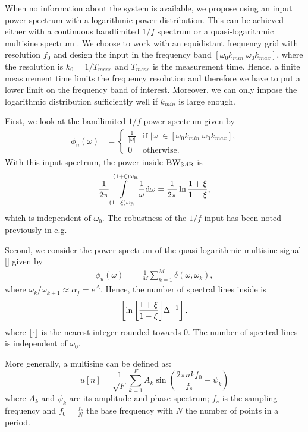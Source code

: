 When no information about the system is available, we propose using an input power spectrum with a logarithmic power distribution. This can be achieved either with a continuous bandlimited $1/f$ spectrum or a quasi-logarithmic multisine spectrum \citep{Pintelon2001}. We choose to work with an equidistant frequency grid with resolution $f_0$ and design the input in the frequency band $[\omega_0k_{min}\; \omega_0k_{max}]$, where the resolution is $k_0=1/T_{meas}$ and $T_{meas}$ is the measurement time. Hence, a finite measurement time limits the frequency resolution and therefore we have to put a lower limit on the frequency band of interest. Moreover, we can only impose the logarithmic distribution sufficiently well if $k_{min}$ is large enough.

First, we look at the bandlimited $1/f$ power spectrum given by
\begin{align*}
\label{eq:pink}
\phi_u(\omega) &=\begin{cases}\frac{1}{|\omega|} &\text{if $|\omega|\in[\omega_0k_{min}\; \omega_0k_{max}]$,}\\
                        0           &\text{otherwise}.
            \end{cases}
\end{align*}
With this input spectrum, the power inside $\mathrm{BW}_{3\,\mathrm{dB}}$ is
\begin{align}
  \frac{1}{2\pi}
    \int\limits_{(1-\xi)\omega_{\mathrm{R}}}^{(1+\xi)\omega_{\mathrm{R}}}
     \frac{1}{\omega} \mathrm{d}{\omega}
  = \frac{1}{2\pi}
    \ln{\frac{1+\ensuremath{\xi}}{1-\ensuremath{\xi}}},
\end{align}
which is independent of $\omega_0$. The robustness of the $1/f$ input has been noted previously in e.g. \cite{Rojas2007}

Second, we consider the power spectrum of the quasi-logarithmic multisine signal [\cite{Pintelon2001}] given by
\begin{align}
  \phi_u(\omega) &= \frac{1}{M}\sum_{k=1}^{M}{\delta(\omega,\omega_k)},
\end{align}
where $\omega_{k}/\omega_{k+1} \approx \alpha_{f} = e^{\Delta}$.
Hence, the number of spectral lines inside \wdB is 
\begin{align}
\left\lfloor\ln{\left[\frac{1+\ensuremath{\xi}}{1-\ensuremath{\xi}}\right]}\Delta^{-1}\right\rfloor,
\end{align}
where $\lfloor\cdot\rfloor$ is the nearest integer rounded towards $0$. The number of spectral lines is independent of $\omega_0$. 

More generally, a multisine can be defined as:
\begin{equation}
 u \left[ n\right] = \frac{1}{\sqrt{F}}
   \sum_{k=1}^{F} 
     A_k 
     \sin 
       \left(\frac{2\pi n k f_0}{f_s} + \psi_k \right)
  \label{eq:MS}
\end{equation}
where $A_k$ and $\psi_k$ are its amplitude and phase spectrum; $f_s$ is the
sampling frequency and $f_0 = \frac{f_s}{N}$ the base frequency with $N$ the 
number of points in a period. 

